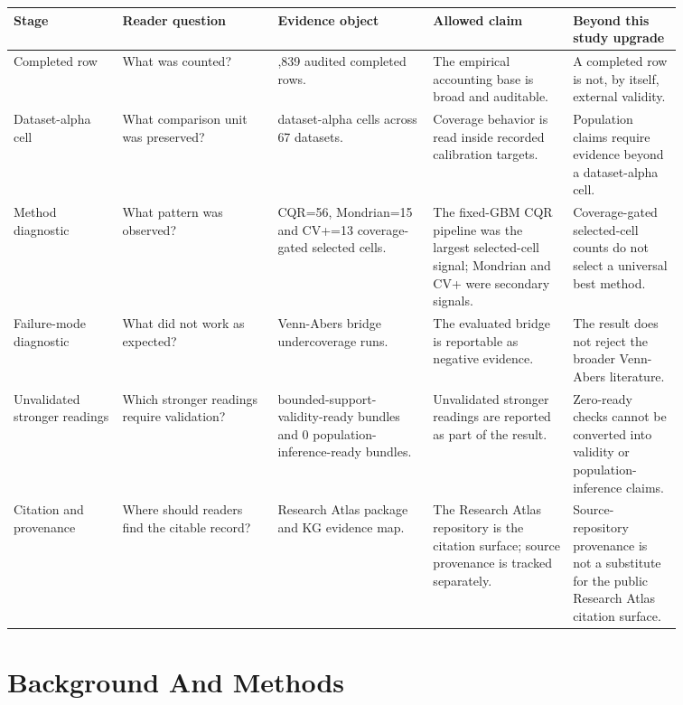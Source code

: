 \documentclass[11pt]{article}
\begin{document}
\begingroup
\footnotesize
\setlength{\tabcolsep}{2pt}
\renewcommand{\arraystretch}{1.18}
\begin{tabular}{@{}>{\RaggedRight\arraybackslash}p{0.140\linewidth}>{\RaggedRight\arraybackslash}p{0.200\linewidth}>{\RaggedRight\arraybackslash}p{0.200\linewidth}>{\RaggedRight\arraybackslash}p{0.180\linewidth}>{\RaggedRight\arraybackslash}p{0.140\linewidth}@{}}
\toprule
Stage & Reader question & Evidence object & Allowed claim & Beyond this study upgrade \\
\midrule
Completed row & What was counted? & 145,839 audited completed rows. & The empirical accounting base is broad and auditable. & A completed row is not, by itself, external validity. \\
Dataset-alpha cell & What comparison unit was preserved? & 95 dataset-alpha cells across 67 datasets. & Coverage behavior is read inside recorded calibration targets. & Population claims require evidence beyond a dataset-alpha cell. \\
Method diagnostic & What pattern was observed? & CQR=56, Mondrian=15 and CV+=13 coverage-gated selected cells. & The fixed-GBM CQR pipeline was the largest selected-cell signal; Mondrian and CV+ were secondary signals. & Coverage-gated selected-cell counts do not select a universal best method. \\
Failure-mode diagnostic & What did not work as expected? & 14 Venn-Abers bridge undercoverage runs. & The evaluated bridge is reportable as negative evidence. & The result does not reject the broader Venn-Abers literature. \\
Unvalidated stronger readings & Which stronger readings require validation? & 0 bounded-support-validity-ready bundles and 0 population-inference-ready bundles. & Unvalidated stronger readings are reported as part of the result. & Zero-ready checks cannot be converted into validity or population-inference claims. \\
Citation and provenance & Where should readers find the citable record? & Research Atlas package and KG evidence map. & The Research Atlas repository is the citation surface; source provenance is tracked separately. & Source-repository provenance is not a substitute for the public Research Atlas citation surface. \\
\bottomrule
\end{tabular}
\endgroup

\section{Background And Methods}
\end{document}
